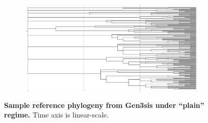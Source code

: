 \begin{figure}
\centering
\begin{subfigure}[b]{1\columnwidth}
\includegraphics[height=0.12\textheight,width=\textwidth]{img/gen3sis-species/model=gen3sis+taxon=species+treatment=plain+seed=1+phylogeny-snapshot-100000.pdf}
  \end{subfigure}
  \caption{%
    \textbf{Sample reference phylogeny from Gen3sis under ``plain'' regime.}
    Time axis is linear-scale.
  }
  \label{fig:perfect-tree-phylogeny-gen3sis}
\end{figure}

